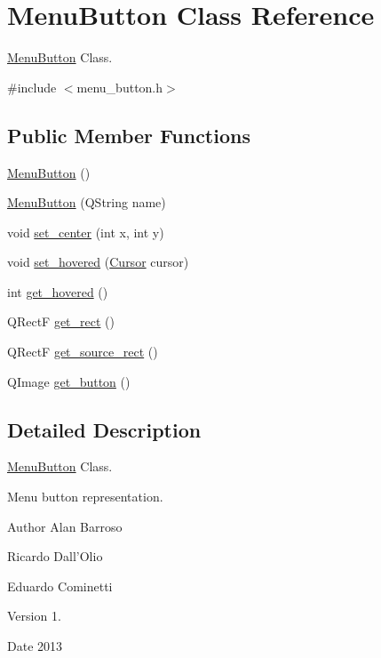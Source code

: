 \hypertarget{class_menu_button}{\section{Menu\-Button Class Reference}
\label{class_menu_button}
}


\hyperlink{class_menu_button}{Menu\-Button} Class.  




{\ttfamily \#include $<$menu\-\_\-button.\-h$>$}

\subsection*{Public Member Functions}
\begin{DoxyCompactItemize}
\item 
\hyperlink{class_menu_button_a322b34a062c93f8604b12bfb35b40073}{Menu\-Button} ()
\item 
\hyperlink{class_menu_button_a5775361752987f11bed0ebb7ed4ec4d6}{Menu\-Button} (Q\-String name)
\item 
void \hyperlink{class_menu_button_a4b94c40e8027d7ab647caeb41d5539c3}{set\-\_\-center} (int x, int y)
\item 
void \hyperlink{class_menu_button_a1261532f14a2d25d3d6a159b19fac922}{set\-\_\-hovered} (\hyperlink{class_cursor}{Cursor} cursor)
\item 
int \hyperlink{class_menu_button_a828ba16f6e7751610965e40835554126}{get\-\_\-hovered} ()
\item 
Q\-Rect\-F \hyperlink{class_menu_button_a229d9535dc4b9d79bd02baa8d6e19146}{get\-\_\-rect} ()
\item 
Q\-Rect\-F \hyperlink{class_menu_button_a5f9eff8b6107444bcc281a1eb63225a5}{get\-\_\-source\-\_\-rect} ()
\item 
Q\-Image \hyperlink{class_menu_button_a587ceb54e9b66e5e1eae576d085c5dc6}{get\-\_\-button} ()
\end{DoxyCompactItemize}


\subsection{Detailed Description}
\hyperlink{class_menu_button}{Menu\-Button} Class. 

Menu button representation. \begin{DoxyAuthor}{Author}
Alan Barroso 

Ricardo Dall'Olio 

Eduardo Cominetti 
\end{DoxyAuthor}
\begin{DoxyVersion}{Version}
1. 
\end{DoxyVersion}
\begin{DoxyDate}{Date}
2013 
\end{DoxyDate}


